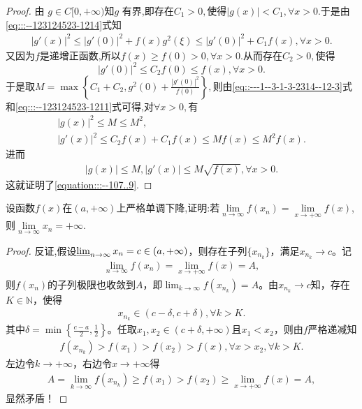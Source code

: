 \documentclass[../../main.tex]{subfiles}
\begin{document}
\begin{proof}
由 \( g\in C[0,+\infty) \)知$g$ 有界,即存在$C_1>0,$使得$|g(x)|<C_1,\forall x>0.$于是由\eqref{eq:::--123124523-1214}式知
\begin{align}
\left| g' (x) \right|^2\leqslant \left| g' (0) \right|^2+f(x)g^2(\xi )\leqslant \left| g' (0) \right|^2+C_1f(x),\forall x>0.\label{eq::---1--3-1-3-2314--12-3}
\end{align}
又因为$f$是递增正函数,所以$f(x)\geqslant f(0)>0,\forall x>0.$从而存在$C_2>0,$使得
$$
|g'(0)|^2\leqslant C_2f(0)\leqslant f(x),\forall x>0.
$$
于是取$M=\max \left\{ C_1+C_2,g^2(0)+\frac{\left| g' (0) \right|^2}{f(0)} \right\},$则由\eqref{eq::---1--3-1-3-2314--12-3}式和\eqref{eq:::--123124523-1211}式可得,对$\forall x>0,$有
\begin{gather*}
\left| g\left( x \right) \right|^2\leqslant M\leqslant M^2,
\\
\left| g' (x) \right|^2\leqslant C_2f\left( x \right) +C_1f(x)\leqslant Mf\left( x \right) \leqslant M^2f\left( x \right) .
\end{gather*}
进而
\begin{align*}
\left| g\left( x \right) \right|\leqslant M,\left| g'(x) \right|\leqslant M\sqrt{f\left( x \right)},\forall x>0.
\end{align*}
这就证明了\eqref{equation:::--107..9}.

\end{proof}

\begin{example}
设函数$f(x)$在$(a,+\infty)$上严格单调下降,证明:若$\lim\limits_{n \to \infty} f(x_n)=\lim\limits_{x \to +\infty} f(x)$,则$\lim\limits_{n \to \infty} x_n=+\infty$. 
\end{example}
\begin{proof}
反证,假设$\varliminf_{n\rightarrow \infty}x_n=c\in \left( a,+\infty \right)$，则存在子列$\{ x_{n_k} \}$，满足$x_{n_k}\rightarrow c$。记
\begin{align*}
\lim_{n\rightarrow \infty}f\left( x_n \right) =\lim_{x\rightarrow +\infty}f\left( x \right) =A,
\end{align*}
则$f\left( x_n \right)$的子列极限也收敛到$A$，即$\lim_{k\rightarrow \infty}f\left( x_{n_k} \right) =A$。由$x_{n_k}\rightarrow c$知，存在$K\in \mathbb{N}$，使得
\begin{align*}
x_{n_k}\in \left( c-\delta ,c+\delta \right),\forall k>K.
\end{align*}
其中$\delta =\min \left\{ \frac{c-a}{2},\frac{1}{2} \right\}$。任取$x_1,x_2\in \left( c+\delta ,+\infty \right)$且$x_1<x_2$，则由$f$严格递减知
\begin{align*}
f\left( x_{n_k} \right) >f\left( x_1 \right) >f\left( x_2 \right) >f\left( x \right),\forall x>x_2,\forall k>K.
\end{align*}
左边令$k\rightarrow +\infty$，右边令$x\rightarrow +\infty$得
\begin{align*}
A=\lim_{k\rightarrow \infty}f\left( x_{n_k} \right) \geqslant f\left( x_1 \right) >f\left( x_2 \right) \geqslant \lim_{x\rightarrow +\infty}f\left( x \right) =A,
\end{align*}
显然矛盾！

\end{proof}
\end{document}
